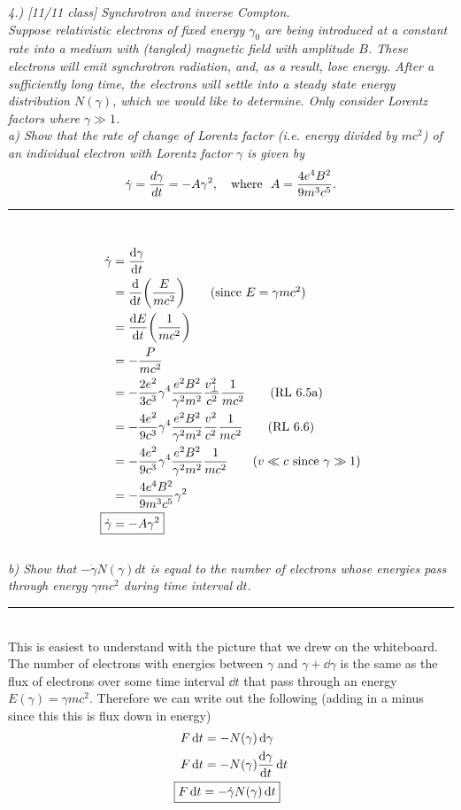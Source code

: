 \documentclass[12pt, letterpaper, twoside]{article}
\newcommand{\answer}[1]{
    \par\noindent\rule{\textwidth}{0.4pt}\\#1\\
}
\begin{document}
{\it 4.) {\it [11/11 class]}  Synchrotron and inverse Compton.\\
Suppose relativistic electrons of fixed energy $\gamma_0$ are being introduced at a constant rate into a medium with (tangled) magnetic field with amplitude $B$. These electrons will emit synchrotron radiation, and, as a result, lose energy. After a sufficiently long time, the electrons will settle into a steady state energy distribution $N(\gamma)$, which we would like to determine. Only consider Lorentz factors where $\gamma \gg 1$.\\
a)  Show that the rate of change of Lorentz factor (i.e. energy divided by $mc^2$) of an individual electron with Lorentz factor $\gamma$ is given by
\begin{equation}
\dot \gamma = \frac{d\gamma}{dt} = -A \gamma^2,   ~~~{\rm where}~~A = \frac{4 e^4 B^2}{9 m^3 c^5}.
\end{equation}}

\answer{
    \begin{align}
        \dot{\gamma} &= \dv{\gamma}{t} \\
                     &= \dv{t} \qty(\frac{E}{m c^2}) \tag{since $E = \gamma m c^2$}\\
                     &= \dv{E}{t} \qty(\frac{1}{m c^2}) \\
                     &= -\frac{P}{m c^2} \\
                     &= -\frac{2 e^2}{3 c^3} \gamma^4 \frac{e^2 B^2}{\gamma^2 m^2} \frac{v_{\perp}^2}{c^2} \frac{1}{m c^2} \tag{RL 6.5a} \\
                     &= -\frac{4 e^2}{9 c^3} \gamma^4 \frac{e^2 B^2}{\gamma^2 m^2} \frac{v^2}{c^2} \frac{1}{m c^2} \tag{RL 6.6} \\
                     &= -\frac{4 e^2}{9 c^3} \gamma^4 \frac{e^2 B^2}{\gamma^2 m^2} \frac{1}{m c^2} \tag{$v \ll c$ since $\gamma \gg 1$} \\
                     &= -\frac{4 e^4 B^2}{9 m^3 c^5} \gamma^2 \\
        \Aboxed{ \dot{\gamma} &= -A \gamma^2 }
    \end{align}
}

{\it b)  Show that $-\dot \gamma N(\gamma)dt$ is equal to the number of electrons whose energies pass through energy $\gamma m c^2$ during time interval $dt$.}

\answer{
    This is easiest to understand with the picture that we drew on the whiteboard. The number of electrons with energies between $\gamma$ and $\gamma + \dd \gamma$ is the same as the flux of electrons over some time interval $\dd{t}$ that pass through an energy $E(\gamma) = \gamma m c^2$. Therefore we can write out the following (adding in a minus since this this is flux down in energy)
    \begin{align}
        F \dd{t} &= - N(\gamma) \dd{\gamma} \\
        F \dd{t} &= - N(\gamma) \dv{\gamma}{t} \dd{t} \\
        \Aboxed{ F \dd{t} &= - \dot{\gamma} N(\gamma) \dd{t} }
    \end{align}
}
\end{document}
